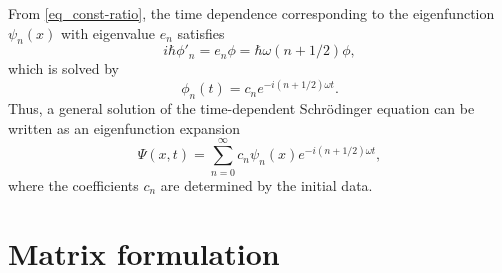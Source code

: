 \documentclass[11pt]{article}
\begin{document}
From \eqref{eq_const-ratio}, the time dependence corresponding to the eigenfunction $\psi_n(x)$ with
eigenvalue $e_n$ satisfies 
\[
i\hbar \phi'_n = e_n \phi = \hbar\omega(n+1/2) \phi,
\]
which is solved by
\[
\phi_n(t) = c_n e^{-i(n+1/2)\omega t}.
\]
Thus, a general solution of the time-dependent Schr\"odinger equation can be written as an
eigenfunction expansion
\[
\Psi(x,t) = \sum_{n=0}^\infty c_n \psi_n(x) e^{-i(n+1/2)\omega t},
\]
where the coefficients $c_n$ are determined by the initial data.

\section{Matrix formulation}



\end{document}
